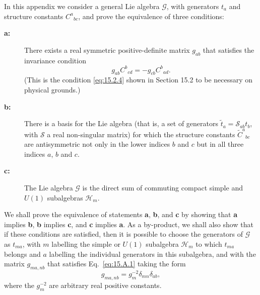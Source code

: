 
In this appendix we consider a general Lie algebra $\mathcal G$, with generators $t_a$ and structure constants $C^a{}_{bc}$, and prove the equivalence of three conditions:

\begin{description}
\item[\textbf{a:}] There exists a real symmetric positive-definite matrix $g_{ab}$ that satisfies the invariance condition
\begin{equation}
 g_{ab}C^b{}_{cd}
 =-g_{cb}C^b{}_{ad}.
 \tag{15.A.1}\label{eq:15.A.1}
\end{equation}
(This is the condition \eqref{eq:15.2.4} shown in Section 15.2 to be necessary on physical grounds.)

\item[\textbf{b:}] There is a basis for the Lie algebra (that is, a set of generators $\widetilde t_a=\mathcal S_{ab}t_b$, with $\mathcal S$ a real non-singular matrix) for which the structure constants $\widetilde C^a{}_{bc}$ are antisymmetric not only in the lower indices $b$ and $c$ but in all three indices $a$, $b$ and $c$.

\item[\textbf{c:}] The Lie algebra $\mathcal G$ is the direct sum of commuting compact simple and $U(1)$ subalgebras $\mathcal H_m$.
\end{description}

We shall prove the equivalence of statements \textbf{a}, \textbf{b}, and \textbf{c} by showing that \textbf{a} implies \textbf{b}, \textbf{b} implies \textbf{c}, and \textbf{c} implies \textbf{a}. As a by-product, we shall also show that if these conditions are satisfied, then it is possible to choose the generators of $\mathcal G$ as $t_{ma}$, with $m$ labelling the simple or $U(1)$ subalgebra $\mathcal H_m$ to which $t_{ma}$ belongs and $a$ labelling the individual generators in this subalgebra, and with the matrix $g_{ma,nb}$ that satisfies Eq.~\eqref{eq:15.A.1} taking the form
\begin{equation}
 g_{ma,nb}=g_m^{-2}\delta_{mn}\delta_{ab},
 \tag{15.A.2}\label{eq:15.A.2}
\end{equation}
where the $g_m^{-2}$ are arbitrary real positive constants.

